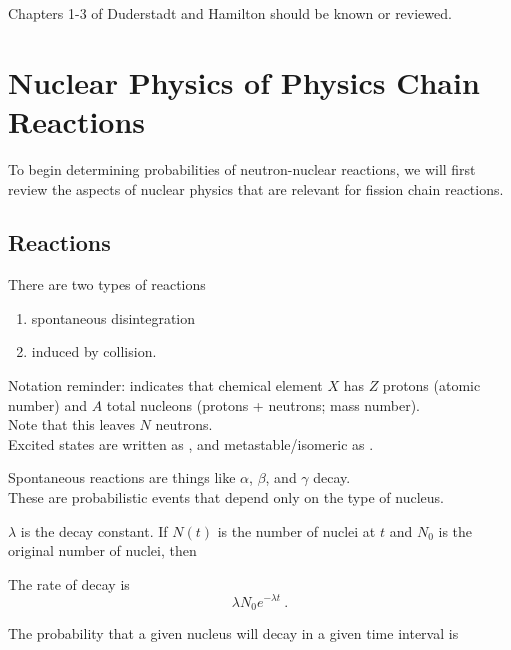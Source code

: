 \documentclass[12pt]{article}
\newif\ifeqns
\begin{document}
Chapters 1-3 of Duderstadt and Hamilton should be known or reviewed.

\clearpage
\section*{Nuclear Physics of Physics Chain Reactions}
To begin determining probabilities of neutron-nuclear reactions, we will first review the aspects of nuclear physics that are relevant for fission chain reactions. 

\subsection*{Reactions}
There are two types of reactions
\begin{enumerate}
\item spontaneous disintegration
\item induced by collision.
\end{enumerate}

Notation reminder:  indicates that chemical element $X$ has $Z$ protons (atomic number) and $A$ total nucleons (protons + neutrons; mass number).\\
Note that this leaves $N$ neutrons.\\
Excited states are written as , and metastable/isomeric as .

Spontaneous reactions are things like $\alpha$, $\beta$, and $\gamma$ decay.\\
These are probabilistic events that depend only on the type of nucleus.

$\lambda$ is the decay constant. If $N(t)$ is the number of nuclei at $t$ and $N_0$ is the original number of nuclei, then
%
\ifeqns
\begin{align*}
N(t + dt) - N(t) &= -\lambda N(t) dt = dN(t)\\
-\frac{dN}{dt} &= \lambda N(t)\\
N(t) &= N_0 e^{-\lambda t}
\end{align*}
\else
\vspace*{4em}
\fi

The rate of decay is\[\lambda N_0 e^{-\lambda t} \:.\]

The probability that a given nucleus will decay in a given time interval is \\
\ifeqns
\[p(t) dt = \lambda e^{-\lambda t} dt \:.\]
\else
\vspace*{1 em}
\fi
\end{document}
